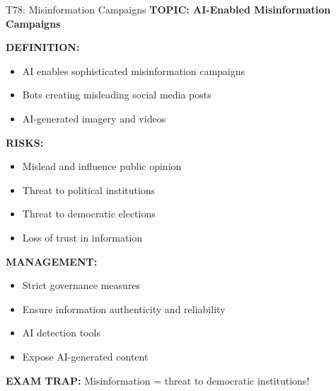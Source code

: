 \documentclass[8pt]{beamer}
\begin{document}
	\begin{frame}{T78: Misinformation Campaigns}
		\fontsize{6.5}{7.5}\selectfont
		\textbf{TOPIC: AI-Enabled Misinformation Campaigns}
		
		\vspace{0.1cm}
		\textbf{DEFINITION:}
		\begin{itemize}
			\item AI enables sophisticated misinformation campaigns
			\item Bots creating misleading social media posts
			\item AI-generated imagery and videos
		\end{itemize}
		
		\vspace{0.1cm}
		\textbf{RISKS:}
		\begin{itemize}
			\item Mislead and influence public opinion
			\item Threat to political institutions
			\item Threat to democratic elections
			\item Loss of trust in information
		\end{itemize}
		
		\vspace{0.1cm}
		\textbf{MANAGEMENT:}
		\begin{itemize}
			\item Strict governance measures
			\item Ensure information authenticity and reliability
			\item AI detection tools
			\item Expose AI-generated content
		\end{itemize}
		
		\textcolor{myred}{\textbf{EXAM TRAP:}} Misinformation = \textcolor{myblue}{threat to democratic institutions}!
	\end{frame}
	
\end{document}
